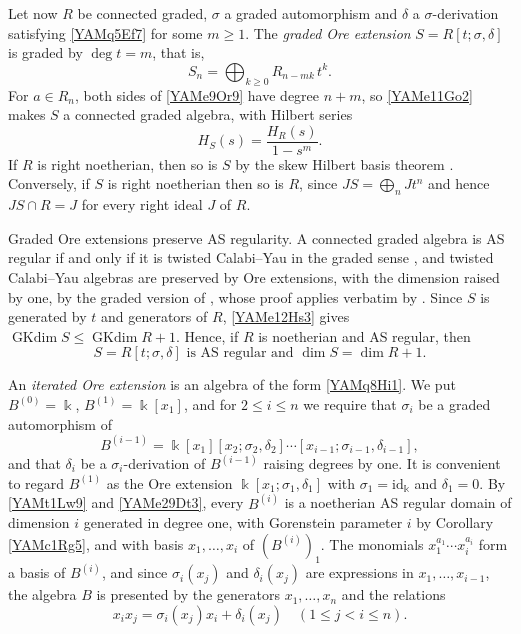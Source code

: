 \documentclass[reqno]{amsart}
\numberwithin{equation}{section}
\theoremstyle{definition}
\theoremstyle{remark}
\theoremstyle{plain}
\newcommand{\kk}{\Bbbk}
\DeclareMathOperator{\GKdim}{GKdim}
\begin{document}
Let now $R$ be connected graded, $\sigma$ a graded automorphism and $\delta$ a $\sigma$-derivation satisfying \eqref{YAMq5Ef7} for some $m\ge1$. The \emph{graded Ore extension} $S=R[t;\sigma,\delta]$ is graded by $\deg t=m$, that is,
\begin{equation}\label{YAMe11Go2}
S_n=\bigoplus_{k\ge0}R_{n-mk}\,t^k.
\end{equation}
For $a\in R_n$, both sides of \eqref{YAMe9Or9} have degree $n+m$, so \eqref{YAMe11Go2} makes $S$ a connected graded algebra, with Hilbert series
\begin{equation}\label{YAMe12Hs3}
H_S(s)=\frac{H_R(s)}{1-s^m}.
\end{equation}
If $R$ is right noetherian, then so is $S$ by the skew Hilbert basis theorem \cite[Theorem 1.2.9]{MR}. Conversely, if $S$ is right noetherian then so is $R$, since $JS=\bigoplus_nJt^n$ and hence $JS\cap R=J$ for every right ideal $J$ of $R$.

Graded Ore extensions preserve AS regularity. A connected graded algebra is AS regular if and only if it is twisted Calabi--Yau in the graded sense \cite[Lemma 1.2]{RRZ}, and twisted Calabi--Yau algebras are preserved by Ore extensions, with the dimension raised by one, by the graded version of \cite[Theorem 3.3]{LWW}, whose proof applies verbatim by \cite[Remark 2.2]{LWW}. Since $S$ is generated by $t$ and generators of $R$, \eqref{YAMe12Hs3} gives $\GKdim S\le\GKdim R+1$. Hence, if $R$ is noetherian and AS regular, then
\begin{equation}\label{YAMt1Lw9}
S=R[t;\sigma,\delta]\text{ is AS regular and }\dim S=\dim R+1.
\end{equation}

An \emph{iterated Ore extension} is an algebra of the form \eqref{YAMq8Hi1}. We put $B^{(0)}=\kk$, $B^{(1)}=\kk[x_1]$, and for $2\le i\le n$ we require that $\sigma_i$ be a graded automorphism of
\[
B^{(i-1)}=\kk[x_1][x_2;\sigma_2,\delta_2]\cdots[x_{i-1};\sigma_{i-1},\delta_{i-1}],
\]
and that $\delta_i$ be a $\sigma_i$-derivation of $B^{(i-1)}$ raising degrees by one. It is convenient to regard $B^{(1)}$ as the Ore extension $\kk[x_1;\sigma_1,\delta_1]$ with $\sigma_1=\mathrm{id}_\kk$ and $\delta_1=0$. By \eqref{YAMt1Lw9} and \eqref{YAMe29Dt3}, every $B^{(i)}$ is a noetherian AS regular domain of dimension $i$ generated in degree one, with Gorenstein parameter $i$ by Corollary \ref{YAMc1Rg5}, and with basis $x_1,\dots,x_i$ of $(B^{(i)})_1$. The monomials $x_1^{a_1}\cdots x_i^{a_i}$ form a basis of $B^{(i)}$, and since $\sigma_i(x_j)$ and $\delta_i(x_j)$ are expressions in $x_1,\dots,x_{i-1}$, the algebra $B$ is presented by the generators $x_1,\dots,x_n$ and the relations
\begin{equation}\label{YAMe13Pr4}
x_ix_j=\sigma_i(x_j)x_i+\delta_i(x_j)\quad(1\le j<i\le n).
\end{equation}
\end{document}
